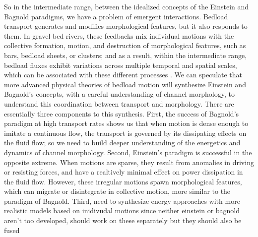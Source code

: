 \documentclass{article}
\begin{document}


So in the intermediate range, between the idealized concepts of the Einstein and Bagnold paradigms, we have a problem of emergent interactions. 
Bedload transport generates and modifies morphological features, but it also responds to them.  
In gravel bed rivers, these feedbacks mix individual motions with the collective formation, motion, and destruction of morphological features, such as bars, bedload sheets, or clusters; and as a result, within the intermediate range, bedload fluxes exhibit variations across multiple temporal and spatial scales, which can be associated with these different processes \citep{Hoey1992, Cudden2003, Nelson2010, Saletti2015, Dhont2018}. 
We can speculate that more advanced physical theories of bedload motion will synthesize Einstein and Bagnold's concepts, with a careful understanding of channel morphology, to understand this coordination between transport and morphology.
There are essentially three components to this synthesis. 
First, the success of Bagnold's paradigm at high transport rates shows us that when motion is dense enough to imitate a continuous flow, the transport is governed by its dissipating effects on the fluid flow; so we need to build deeper understanding of the energetics and dynamics of channel morphology. 
Second, Einstein's paradigm is successful in the opposite extreme. 
When motions are sparse, they result from anomalies in driving or resisting forces, and have a realtively minimal effect on power dissipation in the fluid flow. 
However, these irregular motions spawn morphological features, which can migrate or disintegrate in collective motion, more similar to the paradigm of Bagnold. 
Third, need to synthesize energy approaches with more realistic models based on inidivudal motions
since neither einstein or bagnold aren't too developed, should work on these separately
but they should also be fused 
\end{document}
